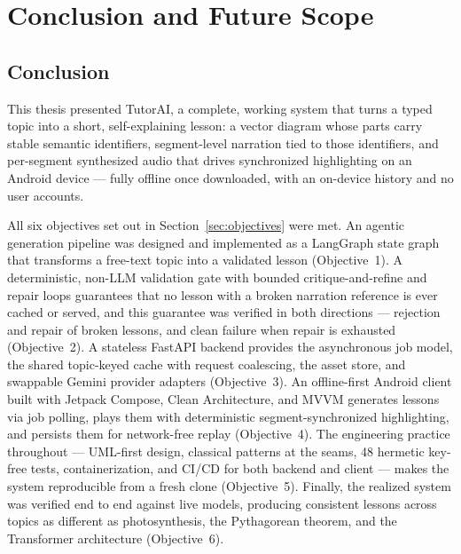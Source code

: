 \chapter{Conclusion and Future Scope}
\label{ch:conclusion}

\section{Conclusion}
\label{sec:conclusion}

This thesis presented TutorAI, a complete, working system that turns a typed
topic into a short, self-explaining lesson: a vector diagram whose parts
carry stable semantic identifiers, segment-level narration tied to those
identifiers, and per-segment synthesized audio that drives synchronized
highlighting on an Android device --- fully offline once downloaded, with an
on-device history and no user accounts.

All six objectives set out in Section~\ref{sec:objectives} were met. An
agentic generation pipeline was designed and implemented as a LangGraph state
graph that transforms a free-text topic into a validated lesson
(Objective~1). A deterministic, non-LLM validation gate with bounded
critique-and-refine and repair loops guarantees that no lesson with a broken
narration reference is ever cached or served, and this guarantee was verified
in both directions --- rejection and repair of broken lessons, and clean
failure when repair is exhausted (Objective~2). A stateless FastAPI backend
provides the asynchronous job model, the shared topic-keyed cache with
request coalescing, the asset store, and swappable Gemini provider adapters
(Objective~3). An offline-first Android client built with Jetpack Compose,
Clean Architecture, and MVVM generates lessons via job polling, plays them
with deterministic segment-synchronized highlighting, and persists them for
network-free replay (Objective~4). The engineering practice throughout ---
UML-first design, classical patterns at the seams, 48 hermetic key-free
tests, containerization, and CI/CD for both backend and client --- makes the
system reproducible from a fresh clone (Objective~5). Finally, the realized
system was verified end to end against live models, producing consistent
lessons across topics as different as photosynthesis, the Pythagorean
theorem, and the Transformer architecture (Objective~6).


